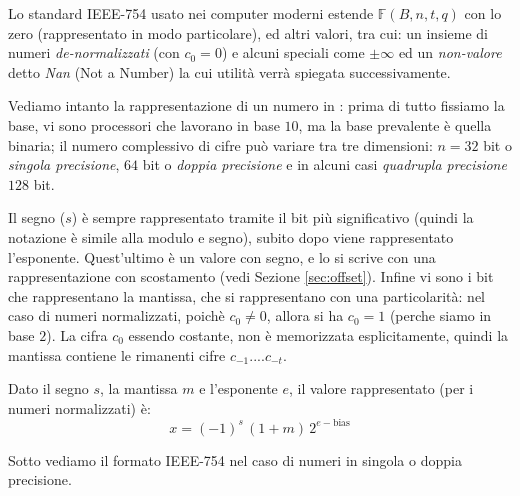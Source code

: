 Lo standard \textsc{IEEE-754} usato nei computer moderni estende $\mathbb{F}(B,n,t,q)$ con lo zero (rappresentato in modo particolare), ed altri valori, tra cui: un insieme di numeri \emph{de-normalizzati} (con $c_0 = 0$) e alcuni speciali come $\pm \infty$ ed un \emph{non-valore} detto \emph{Nan} (Not a Number) la cui utilità verrà spiegata successivamente. 

Vediamo intanto la rappresentazione  di un numero in :
prima di tutto fissiamo la base, vi sono processori che lavorano in base $10$, ma la base prevalente è quella binaria; il numero complessivo di cifre può variare tra tre dimensioni: $n = 32$ bit o \emph{singola precisione}, $64$ bit o \emph{doppia precisione} e in alcuni casi \emph{quadrupla precisione} $128$ bit. 

Il segno ($s$) è sempre rappresentato tramite il bit più significativo (quindi la notazione è simile alla modulo e segno), subito dopo viene rappresentato l'esponente. Quest'ultimo è un valore con segno, e lo si scrive con una rappresentazione con scostamento (vedi Sezione \ref{sec:offset}). Infine vi sono i bit che rappresentano la mantissa, che si rappresentano con una particolarità: nel caso di numeri normalizzati, poichè $c_0 \neq 0$, allora si ha $c_0 = 1$ (perche siamo in base $2$). La cifra $c_0$ essendo costante, non è memorizzata esplicitamente, quindi la mantissa contiene le rimanenti cifre $c_{-1}....c_{-t}$.

Dato il segno $s$, la mantissa $m$ e l'esponente $e$, il valore rappresentato (per i numeri normalizzati) è: 
\begin{equation}\label{eq:normalnumber} 
	x = (-1)^s\, (1+m)\, 2^{e-\text{bias}} 
\end{equation}

Sotto vediamo il formato IEEE-754 nel caso di numeri in singola o doppia precisione.\bigskip

